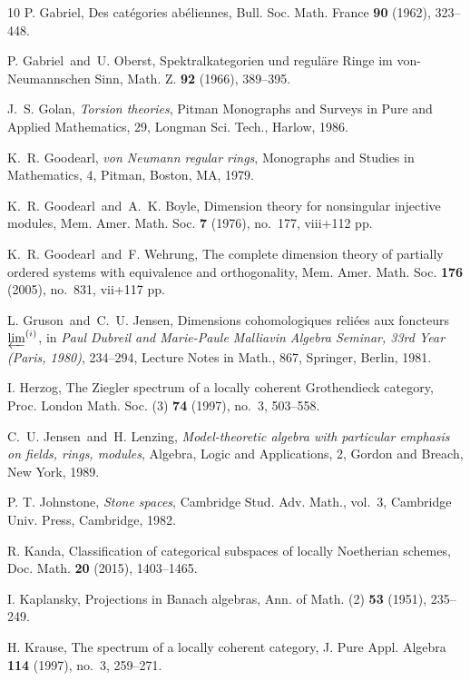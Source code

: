 \documentclass[a4paper]{amsart}
\theoremstyle{plain}
\theoremstyle{definition}
\theoremstyle{remark}
\numberwithin{equation}{section}
\begin{document}
\begin{thebibliography}{10}
 P. Gabriel, Des cat\'egories ab\'eliennes,
  Bull. Soc. Math. France {\bf 90} (1962), 323--448.

 P. Gabriel\ and\ U. Oberst, Spektralkategorien und
  regul\"{a}re Ringe im von-Neumannschen Sinn, Math. Z. {\bf 92}
  (1966), 389--395.

 J.~S. Golan, {\it Torsion theories}, Pitman
  Monographs and Surveys in Pure and Applied Mathematics, 29, Longman
  Sci. Tech., Harlow, 1986.

 K.~R. Goodearl, {\it von Neumann regular rings},
  Monographs and Studies in Mathematics, 4, Pitman, Boston, MA, 1979.

 K.~R. Goodearl\ and\ A.~K. Boyle, Dimension theory
  for nonsingular injective modules, Mem. Amer. Math. Soc. {\bf 7}
  (1976), no.~177, {\rm viii}+112 pp.

 K.~R. Goodearl\ and\ F. Wehrung, The complete
  dimension theory of partially ordered systems with equivalence and
  orthogonality, Mem. Amer. Math. Soc. {\bf 176} (2005), no.~831,
  vii+117 pp.
  
 L. Gruson\ and\ C.~U. Jensen, Dimensions
  cohomologiques reli\'{e}es aux foncteurs $\varprojlim\sp{(i)}$, in
  {\it Paul Dubreil and Marie-Paule Malliavin Algebra Seminar, 33rd
    Year (Paris, 1980)}, 234--294, Lecture Notes in Math., 867,
  Springer, Berlin, 1981.

 I. Herzog, The Ziegler spectrum of a locally coherent
  Grothendieck category, Proc. London Math. Soc. (3) {\bf 74} (1997),
  no.~3, 503--558.

 C.~U. Jensen\ and\ H. Lenzing, {\it Model-theoretic
    algebra with particular emphasis on fields, rings, modules},
  Algebra, Logic and Applications, 2, Gordon and Breach, New York,
  1989.

 P. T. Johnstone, \emph{Stone spaces}, Cambridge
  Stud. Adv. Math., vol.~3, Cambridge Univ. Press, Cambridge, 1982.

 R. Kanda, Classification of categorical subspaces of
  locally Noetherian schemes, Doc. Math. {\bf 20} (2015), 1403--1465.

 I. Kaplansky, Projections in Banach algebras, Ann. of
  Math. (2) {\bf 53} (1951), 235--249.
  
 H. Krause, The spectrum of a locally coherent
  category, J. Pure Appl. Algebra {\bf 114} (1997), no.~3, 259--271.


\end{thebibliography}
\end{document}

